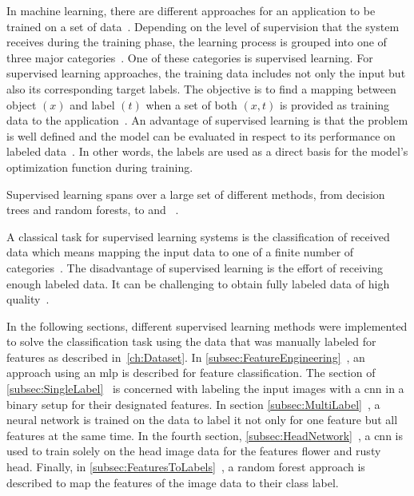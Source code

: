 In machine learning, there are different approaches for an application to be trained on a set of data~\citep{geron2019hands,bishop2006pattern}. Depending on the level of supervision that the system receives during the training phase, the learning process is grouped into one of three major categories~\citep{geron2019hands}. One of these categories is supervised learning. For supervised learning approaches, the training data includes not only the input but also its corresponding target labels. The objective is to find a mapping between object \((x)\) and label \((t)\) when a set of both \((x,t)\) is provided as training data to the application~\citep{olivier2006semi}. An advantage of supervised learning is that the problem is well defined and the model can be evaluated in respect to its performance on labeled data~\citep{daume2012course,olivier2006semi}. In other words, the labels are used as a direct basis for the model’s optimization function during training.

Supervised learning spans over a large set of different methods, from decision trees and random forests, to   and ~\citep{caruana2006comparison,geron2019hands}.

A classical task for supervised learning systems is the classification of received data which means  mapping the input data to one of a finite number of categories~\citep{bishop2006pattern}.
The disadvantage of supervised learning is the effort of receiving enough labeled data. It can be challenging to obtain fully labeled data of high quality~\citep{zhu05survey,figueroa2012predicting}.

\bigskip
In the following sections, different supervised learning methods were implemented to solve the classification task using the data that was manually labeled for features as described in~\autoref{ch:Dataset}. In \ref{subsec:FeatureEngineering}~, an approach using an \acrshort{mlp} is described for feature classification. The section of \ref{subsec:SingleLabel}~ is concerned with labeling the input images with a \acrshort{cnn} in a binary setup for their designated features. In section \ref{subsec:MultiLabel}~, a neural network is trained on the data to label it not only for one feature but all features at the same time. In the fourth section, \ref{subsec:HeadNetwork}~, a \acrshort{cnn} is used to train solely on the head image data for the features flower and rusty head.
Finally, in \ref{subsec:FeaturesToLabels}~, a random forest approach is described to map the features of the image data to their class label.


